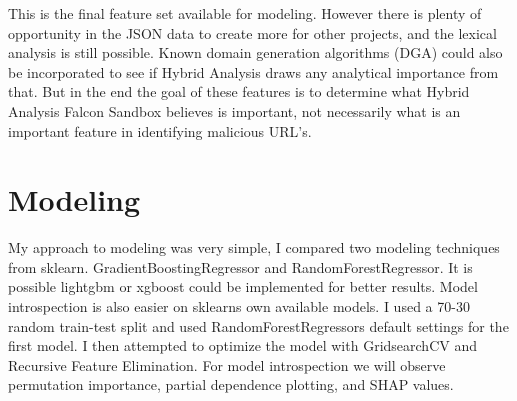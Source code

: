 \documentclass[conference]{IEEEtran}
\begin{document}
\begin{enumerate}
\end{enumerate}
This is the final feature set available for modeling. However there is plenty of opportunity in the JSON data to create more for other projects, and the lexical analysis is still possible. Known domain generation algorithms (DGA) could also be incorporated to see if Hybrid Analysis draws any analytical importance from that. But in the end the goal of these features is to determine what Hybrid Analysis Falcon Sandbox believes is important, not necessarily what is an important feature in identifying malicious URL's.

\section{Modeling}
My approach to modeling was very simple, I compared two modeling techniques from sklearn. GradientBoostingRegressor and RandomForestRegressor. It is possible lightgbm or xgboost could be implemented for better results. Model introspection is also easier on sklearns own available models. I used a 70-30 random train-test split and used RandomForestRegressors default settings for the first model. I then attempted to optimize the model with GridsearchCV and Recursive Feature Elimination. For model introspection we will observe permutation importance, partial dependence plotting, and SHAP values.
\end{document}
